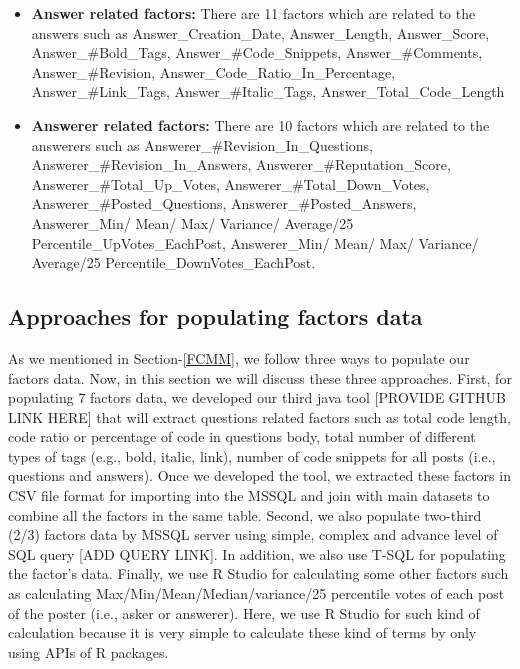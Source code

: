 \documentclass[conference]{IEEEtran}
\begin{document}
\begin{itemize}
	\item \textbf{Answer related factors: } There are 11 factors which are related to the answers such as Answer\_Creation\_Date, Answer\_Length, Answer\_Score, Answer\_\#Bold\_Tags, Answer\_\#Code\_Snippets, Answer\_\#Comments, Answer\_\#Revision, Answer\_Code\_Ratio\_In\_Percentage,  Answer\_\#Link\_Tags, Answer\_\#Italic\_Tags, Answer\_Total\_Code\_Length
	\item \textbf{Answerer related factors: } There are 10 factors which are related to the answerers such as Answerer\_\#Revision\_In\_Questions, Answerer\_\#Revision\_In\_Answers, Answerer\_\#Reputation\_Score, Answerer\_\#Total\_Up\_Votes, Answerer\_\#Total\_Down\_Votes, Answerer\_\#Posted\_Questions, Answerer\_\#Posted\_Answers, 
	Answerer\_Min/ Mean/ Max/ Variance/ Average/25 Percentile\_UpVotes\_EachPost, Answerer\_Min/ Mean/ Max/ Variance/ Average/25 Percentile\_DownVotes\_EachPost.
	
\end{itemize}

\subsection{Approaches for populating factors data}
As we mentioned in Section-\ref{FCMM}, we follow three ways to populate our factors data. Now, in this section we will discuss these three approaches. First, for populating 7 factors data, we developed our third java tool [PROVIDE GITHUB LINK HERE] that will extract questions related factors such as total code length, code ratio or percentage of code in questions body, total number of different types of tags (e.g., bold, italic, link), number of code snippets for all posts (i.e., questions and answers). Once we developed the tool, we extracted these factors in CSV file format for importing into the MSSQL and join with main datasets to combine all the factors in the same table. Second, we also populate two-third (2/3) factors data by MSSQL server using simple, complex and advance level of SQL query [ADD QUERY LINK]. In addition, we also use T-SQL for populating the factor's data. Finally, we use R Studio for calculating some other factors such as  calculating Max/Min/Mean/Median/variance/25 percentile votes of each post of the poster (i.e., asker or answerer). Here, we use R Studio for such kind of calculation because it is very simple to calculate these kind of terms by only using APIs of R packages. 
\end{document}
